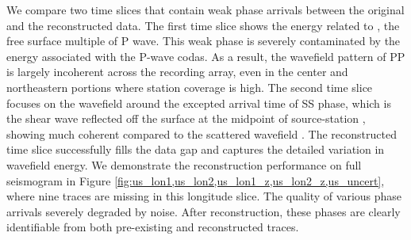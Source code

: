 We compare two time slices that contain weak phase arrivals between the original and the reconstructed data.  The first time slice shows the energy related to  , the free surface multiple of P wave. This weak phase is severely contaminated by the  energy associated with the P-wave codas.  As a result, the wavefield pattern of PP is largely incoherent across the recording array, even in the center and northeastern portions where station coverage is high. The second time slice focuses on the wavefield around the excepted arrival time of SS phase, which is the shear wave reflected off the surface at the midpoint of source-station , showing much coherent  compared to the scattered wavefield . The reconstructed time slice successfully fills the data gap and captures the detailed variation in wavefield energy. We demonstrate the reconstruction performance on full seismogram in Figure \ref{fig:us_lon1,us_lon2,us_lon1_z,us_lon2_z,us_uncert}, where nine traces are missing in this longitude slice. The quality of various phase arrivals  severely degraded by noise.  After reconstruction, these phases are clearly identifiable from both pre-existing and reconstructed traces.  

